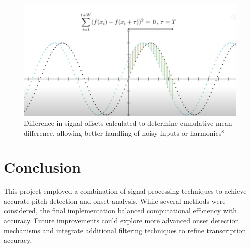 \documentclass{article}
\begin{document}
\begin{figure}[h]
\includegraphics[width=125mm,scale=0.5]{docs/LiteratureReview/images/yin-function.png}
\caption{Difference in signal offsets calculated to determine cumulative mean difference, allowing better handling of noisy inputs or harmonics$^8$}
\end{figure}

\newpage


\section{Conclusion}
This project employed a combination of signal processing techniques to achieve accurate pitch detection and onset analysis. While several methods were considered, the final implementation balanced computational efficiency with accuracy. Future improvements could explore more advanced onset detection mechanisms and integrate additional filtering techniques to refine transcription accuracy.
\end{document}
